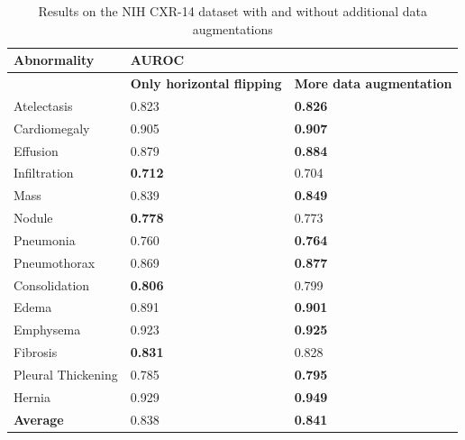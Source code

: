 \documentclass[12pt,oneside,a4paper]{report}
\begin{document}
\begin{table}[]
  \centering
  \begin{tabular}{@{}lll@{}}
    \toprule
    \textbf{Abnormality} & \multicolumn{2}{l}{\textbf{AUROC}}                                  \\ \midrule
    \textbf{}            & \textbf{Only horizontal flipping} & \textbf{More data augmentation} \\ \midrule
    Atelectasis          & 0.823                             & \textbf{0.826}                  \\ \midrule
    Cardiomegaly         & 0.905                             & \textbf{0.907}                  \\ \midrule
    Effusion             & 0.879                             & \textbf{0.884}                  \\ \midrule
    Infiltration         & \textbf{0.712}                    & 0.704                           \\ \midrule
    Mass                 & 0.839                             & \textbf{0.849}                  \\ \midrule
    Nodule               & \textbf{0.778}                    & 0.773                           \\ \midrule
    Pneumonia            & 0.760                             & \textbf{0.764}                  \\ \midrule
    Pneumothorax         & 0.869                             & \textbf{0.877}                  \\ \midrule
    Consolidation        & \textbf{0.806}                    & 0.799                           \\ \midrule
    Edema                & 0.891                             & \textbf{0.901}                  \\ \midrule
    Emphysema            & 0.923                             & \textbf{0.925}                  \\ \midrule
    Fibrosis             & \textbf{0.831}                    & 0.828                           \\ \midrule
    Pleural Thickening  & 0.785                             & \textbf{0.795}                  \\ \midrule
    Hernia               & 0.929                             & \textbf{0.949}                  \\ \midrule
    \textbf{Average}     & 0.838                             & \textbf{0.841}                  \\ \bottomrule
  \end{tabular}
  \caption{Results on the NIH CXR-14 dataset with and without additional data
    augmentations}
  \label{tab:da_vs_noda}
\end{table}
 
\end{document}
